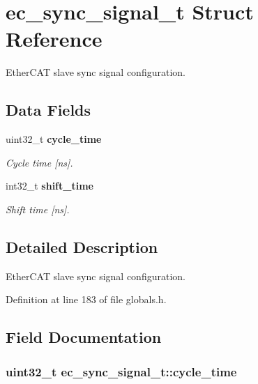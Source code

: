 \section{ec\-\_\-sync\-\_\-signal\-\_\-t \-Struct \-Reference}
\label{structec__sync__signal__t}


\-Ether\-C\-A\-T slave sync signal configuration.  


\subsection*{\-Data \-Fields}
\begin{DoxyCompactItemize}
\item 
uint32\-\_\-t {\bf cycle\-\_\-time}
\begin{DoxyCompactList}\small\item\em \-Cycle time [ns]. \end{DoxyCompactList}\item 
int32\-\_\-t {\bf shift\-\_\-time}
\begin{DoxyCompactList}\small\item\em \-Shift time [ns]. \end{DoxyCompactList}\end{DoxyCompactItemize}


\subsection{\-Detailed \-Description}
\-Ether\-C\-A\-T slave sync signal configuration. 

\-Definition at line 183 of file globals.\-h.



\subsection{\-Field \-Documentation}
\subsubsection[{cycle\-\_\-time}]{\setlength{\rightskip}{0pt plus 5cm}uint32\-\_\-t {\bf ec\-\_\-sync\-\_\-signal\-\_\-t\-::cycle\-\_\-time}}\label{structec__sync__signal__t_a584e9c4963c35777cfc06838793e20e0}


